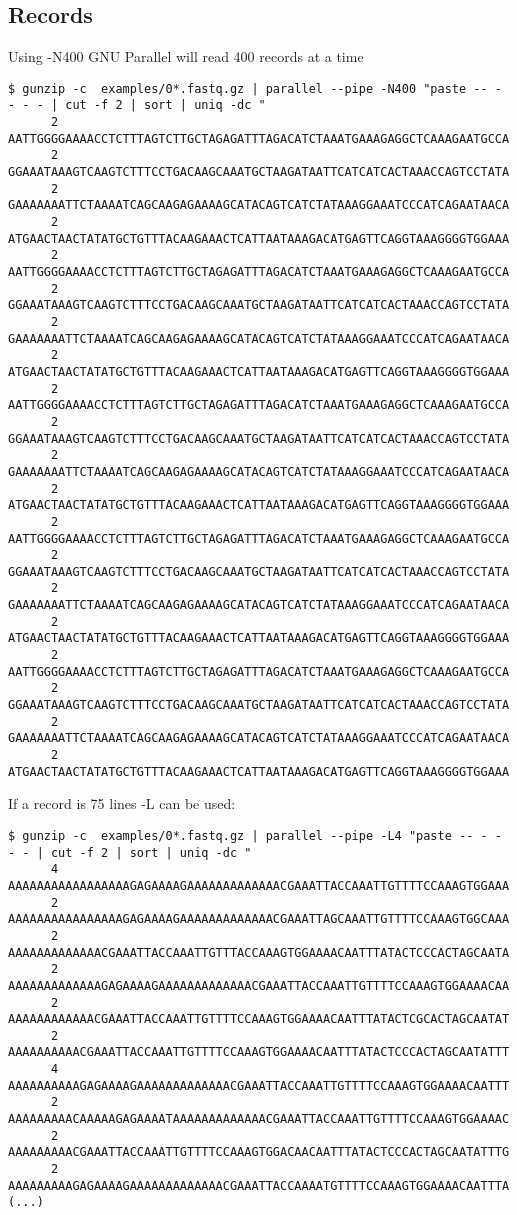 \documentclass{article}
\begin{document}
\subsection{Records}
Using -N400 GNU Parallel will read 400 records at a time
\begin{lstlisting}
$ gunzip -c  examples/0*.fastq.gz | parallel --pipe -N400 "paste -- - - - - | cut -f 2 | sort | uniq -dc " 
      2 AATTGGGGAAAACCTCTTTAGTCTTGCTAGAGATTTAGACATCTAAATGAAAGAGGCTCAAAGAATGCCA
      2 GGAAATAAAGTCAAGTCTTTCCTGACAAGCAAATGCTAAGATAATTCATCATCACTAAACCAGTCCTATA
      2 GAAAAAAATTCTAAAATCAGCAAGAGAAAAGCATACAGTCATCTATAAAGGAAATCCCATCAGAATAACA
      2 ATGAACTAACTATATGCTGTTTACAAGAAACTCATTAATAAAGACATGAGTTCAGGTAAAGGGGTGGAAA
      2 AATTGGGGAAAACCTCTTTAGTCTTGCTAGAGATTTAGACATCTAAATGAAAGAGGCTCAAAGAATGCCA
      2 GGAAATAAAGTCAAGTCTTTCCTGACAAGCAAATGCTAAGATAATTCATCATCACTAAACCAGTCCTATA
      2 GAAAAAAATTCTAAAATCAGCAAGAGAAAAGCATACAGTCATCTATAAAGGAAATCCCATCAGAATAACA
      2 ATGAACTAACTATATGCTGTTTACAAGAAACTCATTAATAAAGACATGAGTTCAGGTAAAGGGGTGGAAA
      2 AATTGGGGAAAACCTCTTTAGTCTTGCTAGAGATTTAGACATCTAAATGAAAGAGGCTCAAAGAATGCCA
      2 GGAAATAAAGTCAAGTCTTTCCTGACAAGCAAATGCTAAGATAATTCATCATCACTAAACCAGTCCTATA
      2 GAAAAAAATTCTAAAATCAGCAAGAGAAAAGCATACAGTCATCTATAAAGGAAATCCCATCAGAATAACA
      2 ATGAACTAACTATATGCTGTTTACAAGAAACTCATTAATAAAGACATGAGTTCAGGTAAAGGGGTGGAAA
      2 AATTGGGGAAAACCTCTTTAGTCTTGCTAGAGATTTAGACATCTAAATGAAAGAGGCTCAAAGAATGCCA
      2 GGAAATAAAGTCAAGTCTTTCCTGACAAGCAAATGCTAAGATAATTCATCATCACTAAACCAGTCCTATA
      2 GAAAAAAATTCTAAAATCAGCAAGAGAAAAGCATACAGTCATCTATAAAGGAAATCCCATCAGAATAACA
      2 ATGAACTAACTATATGCTGTTTACAAGAAACTCATTAATAAAGACATGAGTTCAGGTAAAGGGGTGGAAA
      2 AATTGGGGAAAACCTCTTTAGTCTTGCTAGAGATTTAGACATCTAAATGAAAGAGGCTCAAAGAATGCCA
      2 GGAAATAAAGTCAAGTCTTTCCTGACAAGCAAATGCTAAGATAATTCATCATCACTAAACCAGTCCTATA
      2 GAAAAAAATTCTAAAATCAGCAAGAGAAAAGCATACAGTCATCTATAAAGGAAATCCCATCAGAATAACA
      2 ATGAACTAACTATATGCTGTTTACAAGAAACTCATTAATAAAGACATGAGTTCAGGTAAAGGGGTGGAAA
\end{lstlisting}
If a record is 75 lines -L can be used:
\begin{lstlisting}
$ gunzip -c  examples/0*.fastq.gz | parallel --pipe -L4 "paste -- - - - - | cut -f 2 | sort | uniq -dc "
      4 AAAAAAAAAAAAAAAAAGAGAAAAGAAAAAAAAAAAAACGAAATTACCAAATTGTTTTCCAAAGTGGAAA
      2 AAAAAAAAAAAAAAAAGAGAAAAGAAAAAAAAAAAAACGAAATTAGCAAATTGTTTTCCAAAGTGGCAAA
      2 AAAAAAAAAAAAACGAAATTACCAAATTGTTTACCAAAGTGGAAAACAATTTATACTCCCACTAGCAATA
      2 AAAAAAAAAAAAAGAGAAAAGAAAAAAAAAAAAACGAAATTACCAAATTGTTTTCCAAAGTGGAAAACAA
      2 AAAAAAAAAAAACGAAATTACCAAATTGTTTTCCAAAGTGGAAAACAATTTATACTCGCACTAGCAATAT
      2 AAAAAAAAAACGAAATTACCAAATTGTTTTCCAAAGTGGAAAACAATTTATACTCCCACTAGCAATATTT
      4 AAAAAAAAAAGAGAAAAGAAAAAAAAAAAAACGAAATTACCAAATTGTTTTCCAAAGTGGAAAACAATTT
      2 AAAAAAAAACAAAAAGAGAAAATAAAAAAAAAAAAACGAAATTACCAAATTGTTTTCCAAAGTGGAAAAC
      2 AAAAAAAAACGAAATTACCAAATTGTTTTCCAAAGTGGACAACAATTTATACTCCCACTAGCAATATTTG
      2 AAAAAAAAAGAGAAAAGAAAAAAAAAAAAACGAAATTACCAAAATGTTTTCCAAAGTGGAAAACAATTTA
(...)
\end{lstlisting}
\end{document}
